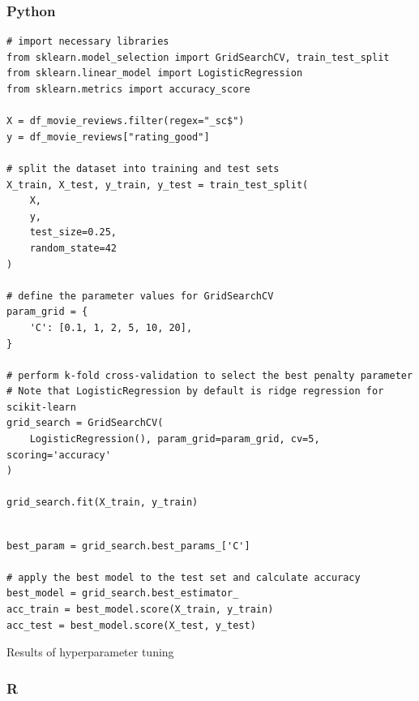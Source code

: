 \documentclass[
  letterpaper,
]{krantz}
\begin{document}
\subsubsection{Python}

\begin{verbatim}
# import necessary libraries
from sklearn.model_selection import GridSearchCV, train_test_split
from sklearn.linear_model import LogisticRegression
from sklearn.metrics import accuracy_score

X = df_movie_reviews.filter(regex="_sc$")
y = df_movie_reviews["rating_good"]

# split the dataset into training and test sets
X_train, X_test, y_train, y_test = train_test_split(
    X, 
    y, 
    test_size=0.25, 
    random_state=42
)

# define the parameter values for GridSearchCV
param_grid = {
    'C': [0.1, 1, 2, 5, 10, 20],
}

# perform k-fold cross-validation to select the best penalty parameter
# Note that LogisticRegression by default is ridge regression for scikit-learn
grid_search = GridSearchCV(
    LogisticRegression(), param_grid=param_grid, cv=5, scoring='accuracy'
)

grid_search.fit(X_train, y_train)
\end{verbatim}

\begin{verbatim}

best_param = grid_search.best_params_['C']

# apply the best model to the test set and calculate accuracy
best_model = grid_search.best_estimator_
acc_train = best_model.score(X_train, y_train)
acc_test = best_model.score(X_test, y_test)
\end{verbatim}

\begin{table}

\caption{\label{tbl-tune-results-py}Results of hyperparameter tuning}


\end{table}%

\subsubsection{R}
\end{document}
